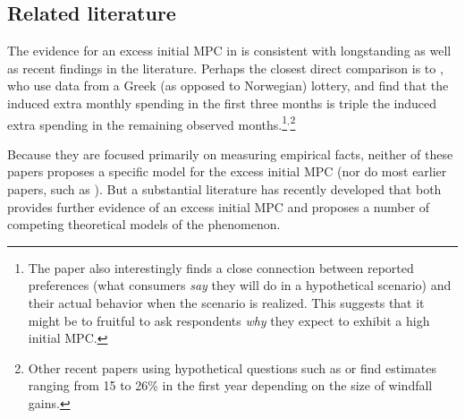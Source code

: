 \documentclass[\econtexRoot/HAFiscal]{subfiles}
\begin{document}
\hypertarget{related-literature}{}\par\subsection{Related literature}
\notinsubfile{\label{sec:lit}}

\hypertarget{excess-initial-mpc-literature}{}
\hypertarget{kotsogiannisMPCs}{}

The evidence for an excess initial MPC in \cite{fagereng_mpc_2021} is consistent with longstanding as well as recent findings in the literature.  Perhaps the closest direct comparison is to \cite{kotsogiannisMPCs}, who use data from a Greek (as opposed to Norwegian) lottery, and find that the induced extra monthly spending in the first three months is triple the induced extra spending in the remaining observed months.\footnote{The paper also interestingly finds a close connection between reported preferences (what consumers \textit{say} they will do in a hypothetical scenario) and their actual behavior when the scenario is realized.  This suggests that it might be to fruitful to ask respondents \textit{why} they expect to exhibit a high initial MPC.}$^{,}$\footnote{Other recent papers using hypothetical questions such as \cite{jappelli2024intertemporal} or \cite{colarieti2024and} find estimates ranging from 15 to 26\% in the first year depending on the size of windfall gains.}  

Because they are focused primarily on measuring empirical facts, neither of these papers proposes a specific model for the excess initial MPC (nor do most earlier papers, such as \cite{parker2013consumer,jpsTax}).  But a substantial literature has recently developed that both provides further evidence of an excess initial MPC and proposes a number of competing theoretical models of the phenomenon.  

\hypertarget{laibson2022simple}{}
\end{document}
